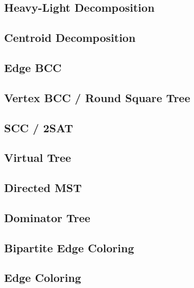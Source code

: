 \subsection{Heavy-Light Decomposition}

\subsection{Centroid Decomposition}

\subsection{Edge BCC}
\subsection{Vertex BCC / Round Square Tree}
\subsection{SCC / 2SAT}
% 
\subsection{Virtual Tree}

\subsection{Directed MST} %
\subsection{Dominator Tree}
\subsection{Bipartite Edge Coloring}

\subsection{Edge Coloring}

